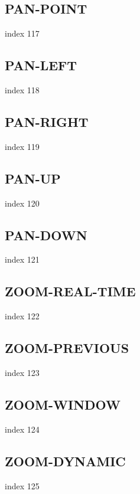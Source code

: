 \documentclass[a4paper]{report}
\begin{document}
\subsection{PAN-POINT}

index 117

\subsection{PAN-LEFT}

index 118

\subsection{PAN-RIGHT}

index 119

\subsection{PAN-UP}

index 120

\subsection{PAN-DOWN}

index 121

\subsection{ZOOM-REAL-TIME}

index 122

\subsection{ZOOM-PREVIOUS}

index 123

\subsection{ZOOM-WINDOW}

index 124

\subsection{ZOOM-DYNAMIC}

index 125
\end{document}
